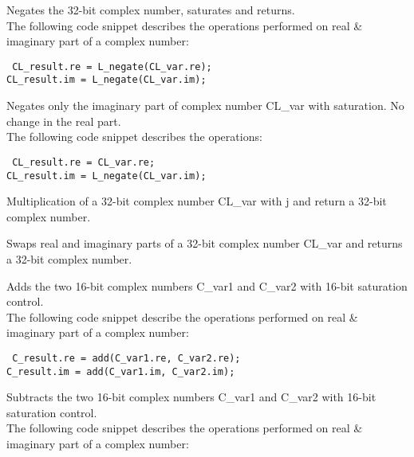 
Negates the 32-bit complex number, saturates and returns.\\
The following code snippet describes the operations performed on real \& imaginary part of a complex number:

{\tt {} CL\_result.re = L\_negate(CL\_var.re);\\
 CL\_result.im = L\_negate(CL\_var.im);
}


Negates only the imaginary part of complex number CL\_var with saturation.
No change in the real part.\\
The following code snippet describes the operations:

{\tt {} CL\_result.re = CL\_var.re;\\
 CL\_result.im = L\_negate(CL\_var.im);
}


Multiplication of a 32-bit complex number CL\_var with j and return a 32-bit complex number.


Swaps real and imaginary parts of a 32-bit complex number CL\_var and returns a 32-bit complex number.


Adds the two 16-bit complex numbers C\_var1 and C\_var2 with 16-bit saturation control.\\
The following code snippet describe the operations performed on real \& imaginary part of a complex number:

{\tt {} C\_result.re = add(C\_var1.re, C\_var2.re);\\
 C\_result.im = add(C\_var1.im, C\_var2.im);
}


Subtracts the two 16-bit complex numbers C\_var1 and C\_var2 with 16-bit saturation control.\\
The following code snippet describes the operations performed on real \& imaginary part of a complex number:

